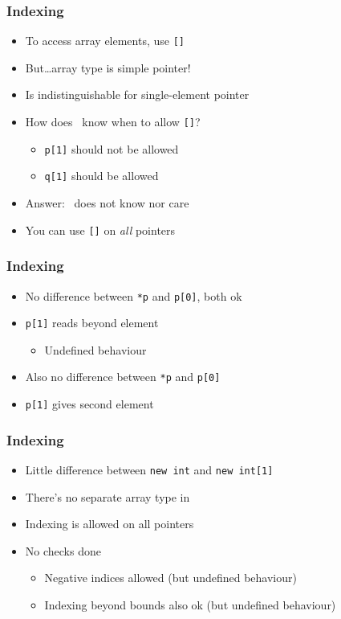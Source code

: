\begin{frame}
  \frametitle{Indexing}
  \begin{itemize}
    \item To access array elements, use \texttt{[]}
    \item But\dots array type is simple pointer!
    \item Is indistinguishable for single-element pointer
    \item How does \cpp\ know when to allow \texttt{[]}?
          \begin{itemize}
            \item \texttt{p[1]} should not be allowed
            \item \texttt{q[1]} should be allowed
          \end{itemize}
    \item Answer: \cpp\ does not know nor care
    \item You can use \texttt{[]} on \emph{all} pointers
  \end{itemize}
\end{frame}

\begin{frame}
  \frametitle{Indexing}
  \begin{itemize}
    \item No difference between \texttt{*p} and \texttt{p[0]}, both ok
    \item \texttt{p[1]} reads beyond element
          \begin{itemize}
            \item Undefined behaviour
          \end{itemize}
  \end{itemize}
  \vskip5mm
  \begin{itemize}
    \item Also no difference between \texttt{*p} and \texttt{p[0]}
    \item \texttt{p[1]} gives second element
  \end{itemize}
\end{frame}

\begin{frame}
  \frametitle{Indexing}
  \begin{itemize}
    \item Little difference between \texttt{new int} and \texttt{new int[1]}
    \item There's no separate array type in \cpp
    \item Indexing is allowed on all pointers
    \item No checks done
          \begin{itemize}
            \item Negative indices allowed (but undefined behaviour)
            \item Indexing beyond bounds also ok (but undefined behaviour)
          \end{itemize}
  \end{itemize}
\end{frame}

